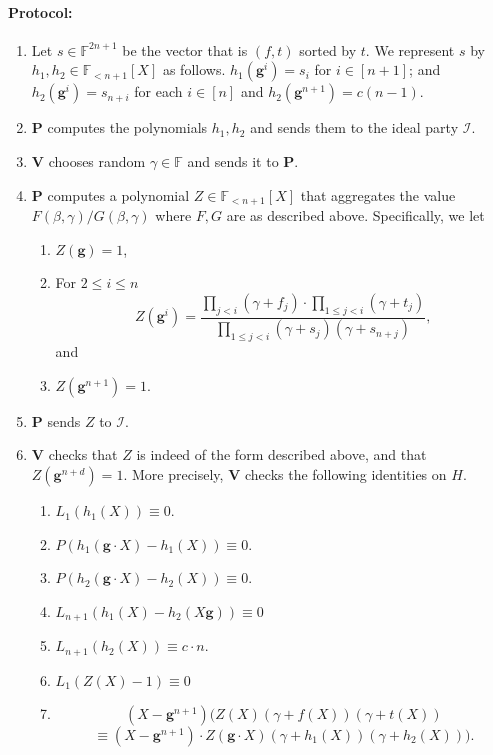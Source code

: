 \documentclass[11pt]{article} %
\newcommand{\F}{\ensuremath{\mathbb F}\xspace}
\newcommand{\dom}{\ensuremath{H}\xspace}
\newcommand{\prv}{\ensuremath{\mathsf{\mathbf{P}}}\xspace}
\newcommand{\prvpoly}{\ensuremath{\prv}\xspace}
\newcommand{\verpoly}{\ensuremath{\ver}\xspace}%
\newcommand{\ideal}{\ensuremath{\mathcal{I}}\xspace}
\newcommand{\ver}{\ensuremath{\mathsf{\mathbf{V}}}\xspace}
\newcommand{\hgen}{\ensuremath{\mathbf{g}}\xspace}
\newcommand{\cosetgen}{\ensuremath{\mathbf{\kappa}}\xspace}
\newcommand{\polysofdeg}[1]{\ensuremath{\F_{< #1}[X]}\xspace}
\newcommand{\sone}{\ensuremath{ h_1}\xspace}
\newcommand{\stwo}{\ensuremath{ h_{2}}\xspace}
\begin{document}
\paragraph{Protocol:}
\begin{enumerate}
 \item Let $s\in \F^{2n+1}$ be the vector that is $(f,t)$ sorted by $t$. We represent $s$ by $\sone,\stwo \in \polysofdeg{n+1}$ as follows.
$\sone (\hgen^i) = s_i$ for $i\in [n+1]$; and $\stwo(\hgen ^i)= s_{n+i}$ for each $i\in [n]$ and $\stwo(\hgen^{n+1})=c(n-1)$.
 
 \item \prvpoly computes the polynomials $\sone,\stwo$ and sends them to the ideal party \ideal.
 \item \verpoly chooses random $\gamma \in \F$ and sends it to \prvpoly.
 \item \prvpoly computes a polynomial $Z\in \polysofdeg{n+1}$ that aggregates the value $F(\beta,\gamma)/G(\beta,\gamma)$ where $F,G$ are as described above. Specifically, we let
\begin{enumerate}
 \item  $Z(\hgen) = 1$,
\item For $2\leq i \leq n$
\[Z(\hgen^{i})= \frac{\prod_{j < i} (\gamma + f_j)\cdot \prod_{1\leq j < i} (\gamma+ t_j)}{\prod_{1\leq j <i} (\gamma + s_j)(\gamma+ s_{n+j})},\]
 and
\item $Z(\hgen^{n+1})=1$.
\end{enumerate}
 \item \prvpoly sends $Z$ to \ideal.
 \item \verpoly checks that $Z$ is indeed of the form described above, and that $Z(\hgen^{n+d})=1$. More precisely, \verpoly checks the following identities on $H$.
 \begin{enumerate}
\item \label{step:rangefirst} $L_1(\sone(X)) \equiv 0$.
\item$P\left(\sone(\hgen\cdot X)- \sone(X)\right)\equiv 0$.
\item $P\left(\stwo(\hgen\cdot  X)- \stwo(X)\right)\equiv 0$.
  \item\label{check:consisttwo} $L_{n+1}(\sone(X)-\stwo(X \hgen))\equiv 0$
\item \label{step:rangefirstlast}$L_{n+1}(\stwo(X)) \equiv c\cdot n$.
  \item \label{step:rangepermfirst}$L_1(Z(X)-1)\equiv 0$
  \item 
  \[(X-\hgen^{n+1}) (Z(X) (\gamma + f(X))(\gamma+ t(X))\]
  \[\equiv (X-\hgen^{n+1})\cdot  Z(\hgen \cdot X)(\gamma+ \sone(X))(\gamma+ \stwo(X))) .\]


\end{enumerate}
\end{enumerate}
\end{document}
